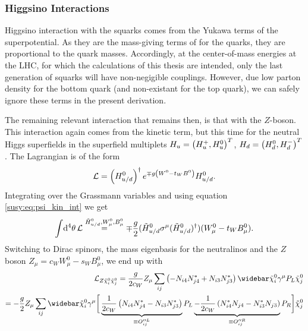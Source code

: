 \documentclass[../main.tex]{subfiles}
\begin{document}
\subsubsection*{Higgsino Interactions}
Higgsino interaction with the squarks comes from the Yukawa terms of the superpotential.
As they are the mass-giving terms of for the quarks, they are proportional to the quark masses.
Accordingly, at the center-of-mass energies at the LHC, for which the calculations of this thesis are intended, only the last generation of squarks will have non-negigible couplings.
However, due low parton density for the bottom quark (and non-existant for the top quark), we can safely ignore these terms in the present derivation.

The remaining relevant interaction that remains then, is that with the \(Z\)-boson.
This interaction again comes from the kinetic term, but this time for the neutral
Higgs superfields in the superfield multiplets \(H_u = \left(H_u^+,
  H_u^0\right)^T\), \(H_d = \left(H_d^0, H_d^-\right)^T\). The Lagrangian is of the form
\begin{equation}
  \mathcal{L} = \left(H_{u/d}^0\right)^\dagger e^{\mp g\left(W^0 - t_W B^0\right)} H_{u/d}^0.
\end{equation}
Integrating over the Grassmann variables and using equation \cref{susy:eq:psi_kin_int} we get
\begin{equation}
  \integral{^4\theta} \L \stackrel{\tilde{H}_{u/d}^0, W^0_\mu, B^0_\mu}{=} \mp \frac{g}{2} (\tilde{H}_{u/d}^0 \sigma\^\mu (\tilde{H}_{u/d}^0)^\dagger) (W^0_\mu - t_W B_\mu^0).
\end{equation}
Switching to Dirac spinors, the mass eigenbasis for the neutralinos and the \(Z\) boson \(Z_\mu = c_W W^0_\mu - s_W B^0_\mu\), we end up with
\begin{align}
  \label{susy:eq:Zneuneu-interaction-L}
  \nonumber
  \L_{Z \tilde\chi^0_i \tilde\chi^0_j} = \frac{g}{2c_W} Z_\mu \sum_{ij}\pclosed{-N_{i4}N_{j4}^\ast + N_{i3}N_{j3}^\ast} \barnino[i] \gamma^\mu P_L \nino[j] \\
  = -\frac{g}{2} Z_\mu \sum_{ij}\barnino[i] \gamma^\mu \bigg[ \underbrace{\frac{1}{2c_W}\pclosed{N_{i4}N_{j4}^\ast - N_{i3}N_{j3}^\ast}}_{\equiv O^{\prime\prime L}_{ij}} P_L \underbrace{-\frac{1}{2c_W}\pclosed{N_{i4}^\ast N_{j4} - N_{i3}^\ast N_{j3}}}_{\equiv O^{\prime\prime R}_{ij}} P_R \bigg] \nino[j]
\end{align}
\end{document}
